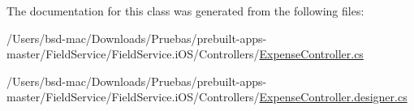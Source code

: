 The documentation for this class was generated from the following files\+:\begin{DoxyCompactItemize}
\item 
/\+Users/bsd-\/mac/\+Downloads/\+Pruebas/prebuilt-\/apps-\/master/\+Field\+Service/\+Field\+Service.\+i\+O\+S/\+Controllers/\hyperlink{_expense_controller_8cs}{Expense\+Controller.\+cs}\item 
/\+Users/bsd-\/mac/\+Downloads/\+Pruebas/prebuilt-\/apps-\/master/\+Field\+Service/\+Field\+Service.\+i\+O\+S/\+Controllers/\hyperlink{_expense_controller_8designer_8cs}{Expense\+Controller.\+designer.\+cs}\end{DoxyCompactItemize}

